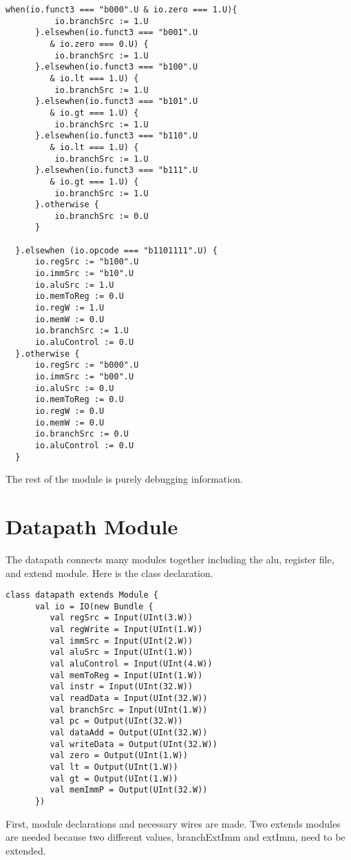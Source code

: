\documentclass[12pt, letterpaper]{report}
\begin{document}
\begin{lstlisting}[style=scala]
      when(io.funct3 === "b000".U & io.zero === 1.U){
          io.branchSrc := 1.U
      }.elsewhen(io.funct3 === "b001".U 
         & io.zero === 0.U) {
          io.branchSrc := 1.U
      }.elsewhen(io.funct3 === "b100".U 
         & io.lt === 1.U) {
          io.branchSrc := 1.U
      }.elsewhen(io.funct3 === "b101".U 
         & io.gt === 1.U) {
          io.branchSrc := 1.U
      }.elsewhen(io.funct3 === "b110".U 
         & io.lt === 1.U) {
          io.branchSrc := 1.U
      }.elsewhen(io.funct3 === "b111".U 
         & io.gt === 1.U) {
          io.branchSrc := 1.U
      }.otherwise {
          io.branchSrc := 0.U
      }

  }.elsewhen (io.opcode === "b1101111".U) {
      io.regSrc := "b100".U
      io.immSrc := "b10".U
      io.aluSrc := 1.U
      io.memToReg := 0.U
      io.regW := 1.U
      io.memW := 0.U
      io.branchSrc := 1.U
      io.aluControl := 0.U
  }.otherwise {
      io.regSrc := "b000".U
      io.immSrc := "b00".U
      io.aluSrc := 0.U
      io.memToReg := 0.U
      io.regW := 0.U
      io.memW := 0.U
      io.branchSrc := 0.U
      io.aluControl := 0.U
  }
\end{lstlisting}

The rest of the module is purely debugging information.

\section{Datapath Module}
The datapath connects many modules together including the alu, register file, and extend module.
Here is the class declaration.
\begin{lstlisting}[style=scala]
   class datapath extends Module {
      val io = IO(new Bundle {
         val regSrc = Input(UInt(3.W))
         val regWrite = Input(UInt(1.W))
         val immSrc = Input(UInt(2.W))
         val aluSrc = Input(UInt(1.W))
         val aluControl = Input(UInt(4.W))
         val memToReg = Input(UInt(1.W))
         val instr = Input(UInt(32.W))
         val readData = Input(UInt(32.W))
         val branchSrc = Input(UInt(1.W))
         val pc = Output(UInt(32.W))
         val dataAdd = Output(UInt(32.W))
         val writeData = Output(UInt(32.W))
         val zero = Output(UInt(1.W))
         val lt = Output(UInt(1.W))
         val gt = Output(UInt(1.W))
         val memImmP = Output(UInt(32.W))
      })
\end{lstlisting}

First, module declarations and necessary wires are made. Two extends modules are needed because 
two different values, branchExtImm and extImm, need to be extended.
\end{document}
